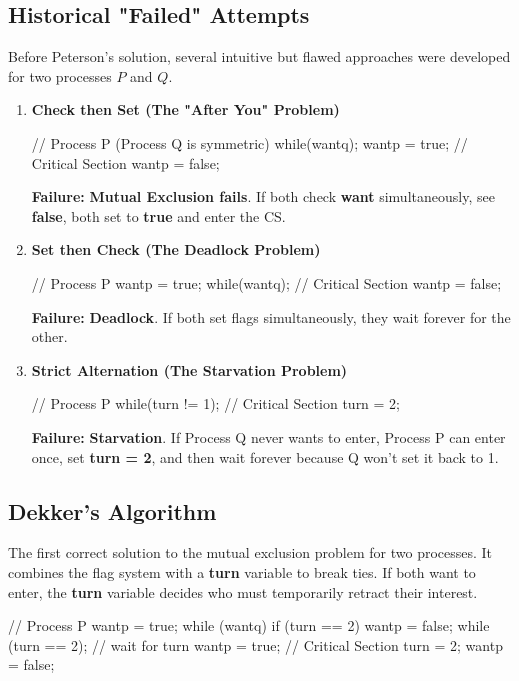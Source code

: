 \subsection{Historical "Failed" Attempts}

Before Peterson's solution, several intuitive but flawed approaches were developed for two processes $P$ and $Q$.

\begin{enumerate}
    \item \textbf{Check then Set (The "After You" Problem)}
    \begin{codeexample}
// Process P (Process Q is symmetric)
while(wantq);
wantp = true;
// Critical Section
wantp = false;
    \end{codeexample}
    \textbf{Failure:} \textbf{Mutual Exclusion fails}. If both check \textbf{want} simultaneously, see \textbf{false}, both set to \textbf{true} and enter the CS.

    \item \textbf{Set then Check (The Deadlock Problem)}
    \begin{codeexample}
// Process P
wantp = true;
while(wantq);
// Critical Section
wantp = false;
    \end{codeexample}
    \textbf{Failure:} \textbf{Deadlock}. If both set flags simultaneously, they wait forever for the other.

    \item \textbf{Strict Alternation (The Starvation Problem)}
    \begin{codeexample}
// Process P
while(turn != 1);
// Critical Section
turn = 2;
    \end{codeexample}
    \textbf{Failure:} \textbf{Starvation}. If Process Q never wants to enter, Process P can enter once, set \textbf{turn = 2}, and then wait forever because Q won't set it back to 1.
\end{enumerate}

\subsection{Dekker's Algorithm}
The first correct solution to the mutual exclusion problem for two processes. It combines the flag system with a \textbf{turn} variable to break ties. If both want to enter, the \textbf{turn} variable decides who must temporarily retract their interest.

\begin{codeexample}
// Process P
wantp = true;
while (wantq) {
    if (turn == 2) {
        wantp = false;
        while (turn == 2); // wait for turn
        wantp = true;
    }
}
// Critical Section
turn = 2;
wantp = false;
\end{codeexample}

